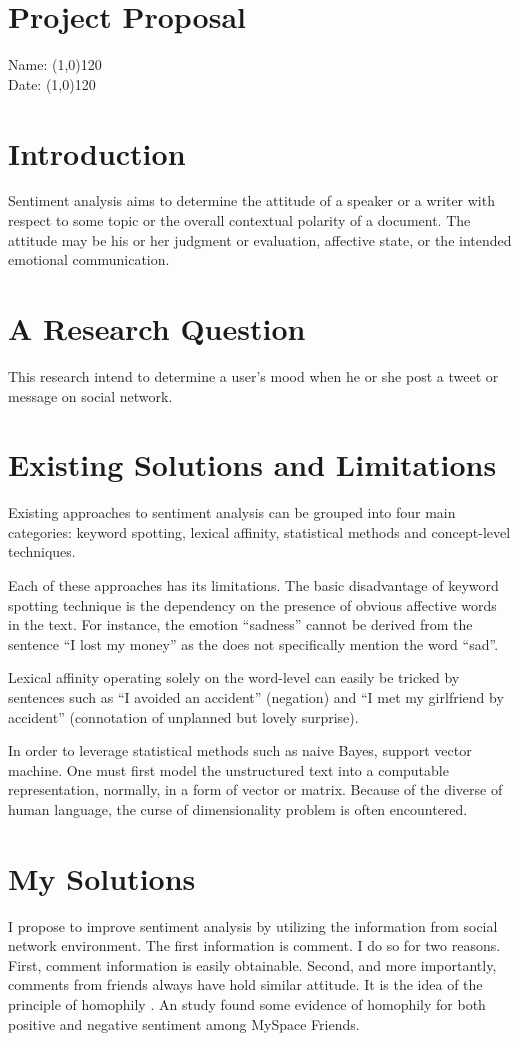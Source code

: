 \documentclass{article}
\begin{document}
\section*{Project Proposal}
Name: \line(1,0){120} %
\\Date: \line(1,0){120}

\section*{Introduction} %
Sentiment analysis aims to determine the attitude of a speaker or a writer with respect to some topic or the overall contextual polarity of a document. The attitude may be his or her judgment or evaluation, affective state, or the intended emotional communication.

\section*{A Research Question}
This research intend to determine a user’s mood when he or she post a tweet or message on social network.
\section*{Existing Solutions and Limitations}
Existing approaches to sentiment analysis can be grouped into four main categories: keyword spotting, lexical affinity, statistical methods and concept-level techniques.

Each of these approaches has its limitations. The basic disadvantage of keyword spotting technique is the dependency on the presence of obvious affective words in the text. For instance, the emotion “sadness” cannot be derived from the sentence “I lost my money” as the does not specifically mention the word “sad”.

Lexical affinity operating solely on the word-level can easily be tricked by sentences such as “I avoided an accident” (negation) and “I met my girlfriend by accident” (connotation of unplanned but lovely surprise).

In order to leverage statistical methods such as naive Bayes, support vector machine. One must first model the unstructured text into a computable representation, normally, in a form of vector or matrix. Because of the diverse of human language, the curse of dimensionality problem is often encountered.
\section*{My Solutions}
I propose to improve sentiment analysis by utilizing the information from social network environment. The first information is comment. 
I do so for two reasons. First, comment information is easily obtainable. Second, and more importantly, comments from friends always 
have hold similar attitude. It is the idea of the principle of homophily \cite{lazarsfeld1954fsp}. 
An study \cite{thelwall2010emotion} found some evidence of homophily for both positive and negative sentiment among MySpace Friends.
\end{document}
